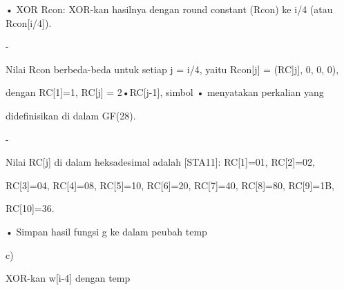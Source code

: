 \documentclass{article}
\begin{document}

• XOR Rcon: XOR-kan hasilnya dengan round constant (Rcon) ke i/4 (atau Rcon[i/4]).

-

Nilai Rcon berbeda-beda untuk setiap j = i/4, yaitu Rcon[j] = (RC]j], 0, 0, 0), 

dengan RC[1]=1, RC[j] = 2•RC[j-1], simbol • menyatakan perkalian yang 

didefinisikan di dalam GF(28). 

-

Nilai RC[j] di dalam heksadesimal adalah [STA11]: RC[1]=01, RC[2]=02, 

RC[3]=04, RC[4]=08, RC[5]=10, RC[6]=20, RC[7]=40, RC[8]=80, RC[9]=1B, 

RC[10]=36. 

• Simpan hasil fungsi g ke dalam peubah temp

c)

XOR-kan w[i-4] dengan temp
\end{document}
